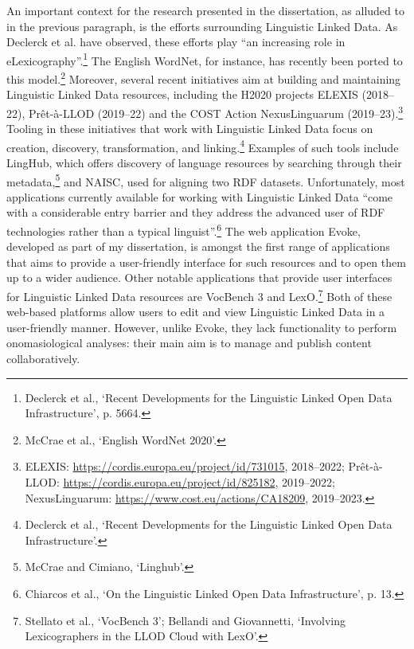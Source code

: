 An important context for the research presented in the dissertation, as alluded to in the previous paragraph, is the efforts surrounding Linguistic Linked Data. As Declerck et al. have observed, these efforts play ``an increasing role in eLexicography''.\footnote{Declerck et al., `Recent Developments for the Linguistic Linked Open Data Infrastructure', p. 5664.} The English WordNet, for instance, has recently been ported to this model.\footnote{McCrae et al., `English WordNet 2020'.} Moreover, several recent initiatives aim at building and maintaining Linguistic Linked Data resources, including the H2020 projects ELEXIS (2018–22), Prêt-à-LLOD (2019–22) and the COST Action NexusLinguarum (2019–23).{\footnote{ELEXIS: \url{https://cordis.europa.eu/project/id/731015}, 2018–2022; Prêt-à-LLOD: \url{https://cordis.europa.eu/project/id/825182}, 2019–2022; NexusLinguarum: \url{https://www.cost.eu/actions/CA18209}, 2019–2023.}} Tooling in these initiatives that work with Linguistic Linked Data focus on creation, discovery, transformation, and linking.\footnote{Declerck et al., `Recent Developments for the Linguistic Linked Open Data Infrastructure'.} Examples of such tools include LingHub, which offers discovery of language resources by searching through their metadata,\footnote{McCrae and Cimiano, `Linghub'.} and NAISC, used for aligning two RDF datasets. Unfortunately, most applications currently available for working with Linguistic Linked Data ``come with a considerable entry barrier and they address the advanced user of RDF technologies rather than a typical linguist''.\footnote{Chiarcos et al., `On the Linguistic Linked Open Data Infrastructure', p. 13.} The web application Evoke, developed as part of my dissertation, is amongst the first range of applications that aims to provide a user-friendly interface for such resources and to open them up to a wider audience. Other notable applications that provide user interfaces for Linguistic Linked Data resources are VocBench 3 and LexO.\footnote{Stellato et al., `VocBench 3'; Bellandi and Giovannetti, `Involving Lexicographers in the LLOD Cloud with LexO'.} Both of these web-based platforms allow users to edit and view Linguistic Linked Data in a user-friendly manner. However, unlike Evoke, they lack functionality to perform onomasiological analyses: their main aim is to manage and publish content collaboratively.

